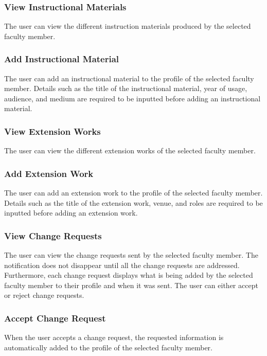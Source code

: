     	\subsubsection{View Instructional Materials}
    	The user can view the different instruction materials produced by the selected faculty member.
    	
    	\subsubsection{Add Instructional Material}
    	The user can add an instructional material to the profile of the selected faculty member. Details such as the title of the instructional material, year of usage, audience, and medium are required to be inputted before adding an instructional material.
    	
    	\subsubsection{View Extension Works}
    	The user can view the different extension works of the selected faculty member.
    	
    	\subsubsection{Add Extension Work}
    	The user can add an extension work to the profile of the selected faculty member. Details such as the title of the extension work, venue, and roles are required to be inputted before adding an extension work.
    	
    	\subsubsection{View Change Requests}
    	The user can view the change requests sent by the selected faculty member. The notification does not disappear until all the change requests are addressed. Furthermore, each change request displays what is being added by the selected faculty member to their profile and when it was sent. The user can either accept or reject change requests.
    	
    	\subsubsection{Accept Change Request}
    	When the user accepts a change request, the requested information is automatically added to the profile of the selected faculty member.
    	

